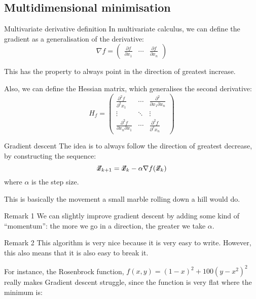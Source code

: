 \documentclass[a4paper]{article}
\begin{document}
\subsection{Multidimensional minimisation}

\begin{parag}{Multivariate derivative definition}
    In multivariate calculus, we can define the gradient as a generalisation of the derivative: 
    \[\nabla f = \begin{pmatrix} \frac{\partial f}{\partial x_1}  & \cdots & \frac{\partial f}{\partial x_n} \end{pmatrix} \]

    This has the property to always point in the direction of greatest increase.
    
    Also, we can define the Hessian matrix, which generalises the second derivative:
    \[H_f = \begin{pmatrix} \frac{\partial^2 f}{\partial^2 x_1} & \cdots & \frac{\partial^2}{\partial x_1 \partial x_n} \\ \vdots & \ddots & \vdots \\ \frac{\partial^2 f}{\partial x_n \partial x_1} & \cdots & \frac{\partial^2 f}{\partial^2 x_n} \end{pmatrix} \]
\end{parag}

\begin{parag}{Gradient descent}
    The idea is to always follow the direction of greatest decrease, by constructing the sequence: 
    \[\bvec{x}_{k+1} = \bvec{x}_k - \alpha \nabla f\left(\bvec{x}_k\right)\]
    where $\alpha$ is the step size.

    This is basically the movement a small marble rolling down a hill would do.

    \begin{subparag}{Remark 1}
        We can slightly improve gradient descent by adding some kind of ``momentum'': the more we go in a direction, the greater we take $\alpha$.
    \end{subparag}
    
    \begin{subparag}{Remark 2}
        This algorithm is very nice because it is very easy to write. However, this also means that it is also easy to break it.

        For instance, the Rosenbrock function, $f\left(x, y\right) = \left(1 - x\right)^2 + 100\left(y - x^2\right)^2$ really makes Gradient descent struggle, since the function is very flat where the minimum is:
    \end{subparag}
\end{parag}
\end{document}
